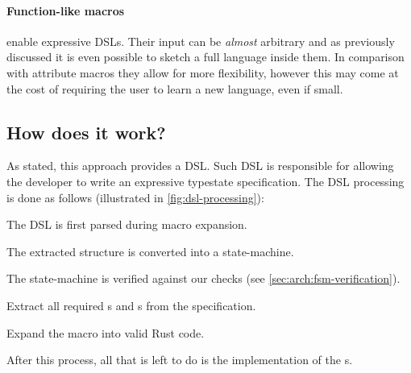 \paragraph{Function-like macros} enable expressive DSLs.
Their input can be \emph{almost} arbitrary and as previously discussed it is even possible to sketch a full language inside them.
In comparison with attribute macros they allow for more flexibility, however this may come at the cost of requiring the user to learn a new language, even if small.


\subsection{How does it work?}

As stated, this approach provides a DSL.
Such DSL is responsible for allowing the developer to write an expressive typestate specification.
The DSL processing is done as follows (illustrated in \autoref{fig:dsl-processing}):
\begin{compactenum}
    \item The DSL is first parsed during macro expansion.
    \item The extracted structure is converted into a state-machine.
    \item The state-machine is verified against our checks (see \autoref{sec:arch:fsm-verification}).
    \item Extract all required s and s from the specification.
    \item Expand the macro into valid Rust code.
\end{compactenum}
After this process, all that is left to do is the implementation of the s.

